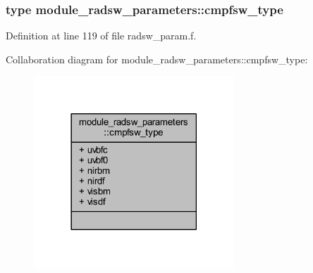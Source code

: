 \subsubsection{type module\+\_\+radsw\+\_\+parameters\+:\+:cmpfsw\+\_\+type}


Definition at line 119 of file radsw\+\_\+param.\+f.



Collaboration diagram for module\+\_\+radsw\+\_\+parameters\+:\+:cmpfsw\+\_\+type\+:\nopagebreak
\begin{figure}[H]
\begin{center}
\leavevmode
\includegraphics[width=213pt]{structmodule__radsw__parameters_1_1cmpfsw__type__coll__graph}
\end{center}
\end{figure}
